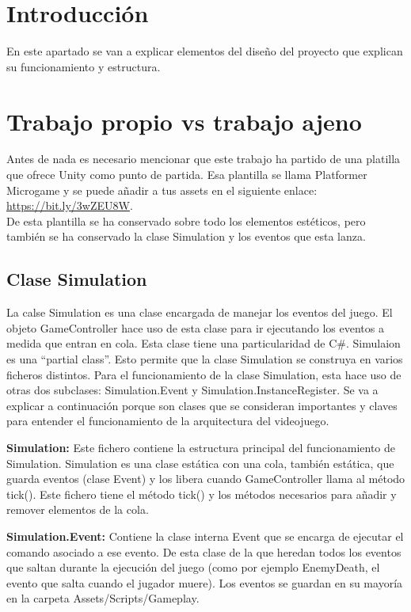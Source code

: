 
\section{Introducción}
En este apartado se van a explicar elementos del diseño del proyecto que explican su funcionamiento y estructura.

\section{Trabajo propio vs trabajo ajeno}
Antes de nada es necesario mencionar que este trabajo ha partido de una platilla que ofrece Unity como punto de partida. Esa plantilla se llama Platformer Microgame y se puede añadir a tus assets en el siguiente enlace:\\
 \url{https://bit.ly/3wZEU8W}.\\ 
De esta plantilla se ha conservado sobre todo los elementos estéticos, pero también se ha conservado la clase Simulation y los eventos que esta lanza.

\subsection{Clase Simulation}
La calse Simulation es una clase encargada de manejar los eventos del juego. El objeto GameController hace uso de esta clase para ir ejecutando los eventos a medida que entran en cola. Esta clase tiene una particularidad de C\#. Simulaion es una “partial class”. Esto permite que la clase Simulation se construya en varios ficheros distintos. Para el funcionamiento de la clase Simulation, esta hace uso de otras dos subclases: Simulation.Event y Simulation.InstanceRegister. Se va a explicar a continuación porque son clases que se consideran importantes y claves para entender el funcionamiento de la arquitectura del videojuego.

\textbf{Simulation:} Este fichero contiene la estructura principal del funcionamiento de Simulation. Simulation es una clase estática con una cola, también estática, que guarda eventos (clase Event) y los libera cuando GameController llama al método tick(). Este fichero tiene el método tick() y los métodos necesarios para añadir y remover elementos de la cola. 

\textbf{Simulation.Event:} Contiene la clase interna Event que se encarga de ejecutar el comando asociado a ese evento. De esta clase de la que heredan todos los eventos que saltan durante la ejecución del juego (como por ejemplo EnemyDeath, el evento que salta cuando el jugador muere). Los eventos se guardan en su mayoría en la carpeta Assets/Scripts/Gameplay.

